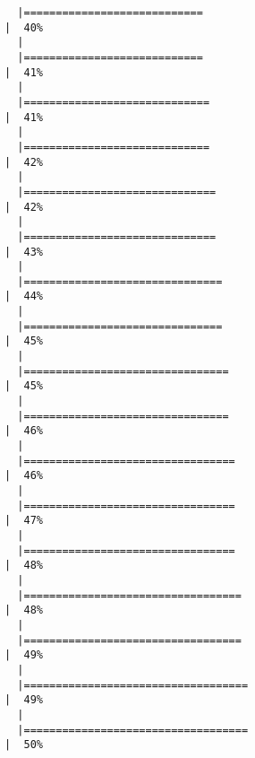 \documentclass[
  letterpaper,
]{book}
\begin{document}
\begin{verbatim}
  |============================                                          |  40%
  |                                                                            
  |============================                                          |  41%
  |                                                                            
  |=============================                                         |  41%
  |                                                                            
  |=============================                                         |  42%
  |                                                                            
  |==============================                                        |  42%
  |                                                                            
  |==============================                                        |  43%
  |                                                                            
  |===============================                                       |  44%
  |                                                                            
  |===============================                                       |  45%
  |                                                                            
  |================================                                      |  45%
  |                                                                            
  |================================                                      |  46%
  |                                                                            
  |=================================                                     |  46%
  |                                                                            
  |=================================                                     |  47%
  |                                                                            
  |=================================                                     |  48%
  |                                                                            
  |==================================                                    |  48%
  |                                                                            
  |==================================                                    |  49%
  |                                                                            
  |===================================                                   |  49%
  |                                                                            
  |===================================                                   |  50%

\end{verbatim}
\end{document}
